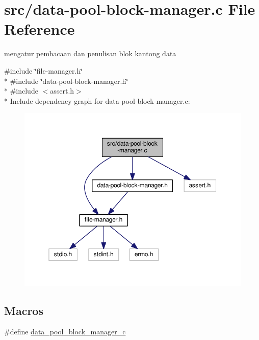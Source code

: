 \hypertarget{data-pool-block-manager_8c}{\section{src/data-\/pool-\/block-\/manager.c File Reference}
\label{data-pool-block-manager_8c}
}


mengatur pembacaan dan penulisan blok kantong data  


{\ttfamily \#include \char`\"{}file-\/manager.\-h\char`\"{}}\\*
{\ttfamily \#include \char`\"{}data-\/pool-\/block-\/manager.\-h\char`\"{}}\\*
{\ttfamily \#include $<$assert.\-h$>$}\\*
Include dependency graph for data-\/pool-\/block-\/manager.c\-:\nopagebreak
\begin{figure}[H]
\begin{center}
\leavevmode
\includegraphics[width=350pt]{data-pool-block-manager_8c__incl}
\end{center}
\end{figure}
\subsection*{Macros}
\begin{DoxyCompactItemize}
\item 
\#define \hyperlink{data-pool-block-manager_8c_acc334690346a1892e11c892ed27f70e7}{data\-\_\-pool\-\_\-block\-\_\-manager\-\_\-c}
\end{DoxyCompactItemize}
